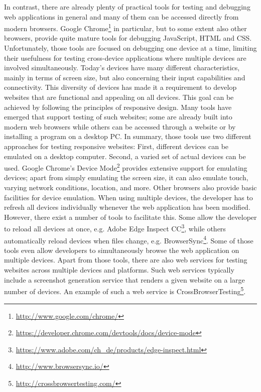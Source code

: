 In contrast, there are already plenty of practical tools for testing and debugging web applications in general and many of them can be accessed directly from modern browsers. Google Chrome\footnote{\url{http://www.google.com/chrome/}} in particular, but to some extent also other browsers, provide quite mature tools for debugging JavaScript, HTML and CSS. Unfortunately, those tools are focused on debugging one device at a time, limiting their usefulness for testing cross-device applications where multiple devices are involved simultaneously.  Today's devices have many different characteristics, mainly in terms of screen size, but also concerning their input capabilities and connectivity. This diversity of devices has made it a requirement to develop websites that are functional and appealing on all devices. This goal can be achieved by following the principles of responsive design. Many tools have emerged that support testing of such websites; some are already built into modern web browsers while others can be accessed through a website or by installing a program on a desktop PC. In summary, those tools use two different approaches for testing responsive websites: First, different devices can be emulated on a desktop computer. Second, a varied set of actual devices can be used. Google Chrome's Device Mode\footnote{\url{https://developer.chrome.com/devtools/docs/device-mode}} provides extensive support for emulating devices; apart from simply emulating the screen size, it can also emulate touch, varying network conditions, location, and more. Other browsers also provide basic facilities for device emulation. When using multiple devices, the developer has to refresh all devices individually whenever the web application has been modified. However, there exist a number of tools to facilitate this. Some allow the developer to reload all devices at once, e.g. Adobe Edge Inspect CC\footnote{\url{https://www.adobe.com/ch_de/products/edge-inspect.html}}, while others automatically reload devices when files change, e.g. BrowserSync\footnote{\url{http://www.browsersync.io/}}. Some of those tools even allow developers to simultaneously browse the web application on multiple devices. Apart from those tools, there are also web services for testing websites across multiple devices and platforms. Such web services typically include a screenshot generation service that renders a given website on a large number of devices. An example of such a web service is CrossBrowserTesting\footnote{\url{http://crossbrowsertesting.com/}}.

